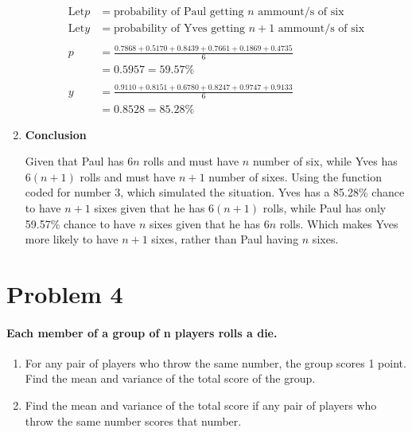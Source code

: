 \documentclass[12pt,letterpaper]{article}
\begin{document}
\begin{enumerate}[label=\Alph*]
        \begin{align*}
          \mbox{Let} p&=\mbox{probability of Paul getting $n$ ammount/s of six}\\
          \mbox{Let} y&=\mbox{probability of Yves getting $n+1$ ammount/s of six}\\\\
          p&=\frac{0.7868+0.5170+0.8439+0.7661+0.1869+0.4735}{6}\\
          &=0.5957=59.57\%\\\\
          y&=\frac{0.9110+0.8151+0.6780+0.8247+0.9747+0.9133}{6}\\
          &=0.8528=85.28\%
        \end{align*}

        \item \textbf{Conclusion}
        
        Given that Paul has $6n$ rolls and must have $n$ number of six, while Yves has $6(n + 1)$ rolls and must have $n+1$ number of sixes. Using the function coded for number 3, which simulated the situation. Yves has a 85.28\% chance to have $n + 1$ sixes given that he has $6(n + 1)$ rolls, while Paul has only 59.57\% chance to have $n$ sixes given that he has $6n$ rolls. Which makes Yves more likely to have $n + 1$ sixes, rather than Paul having $n$ sixes.
    \end{enumerate}

    \newpage

    \section*{Problem 4}
    \paragraph*{Each member of a group of n players rolls a die.}
    \begin{enumerate}[label=(\alph*)]
      \item For any pair of players who throw the same number, the group scores 1 point. Find the mean and variance of the total score of the group.
      \item Find the mean and variance of the total score if any pair of players who throw the same number scores that number.
    \end{enumerate}
\end{document}
